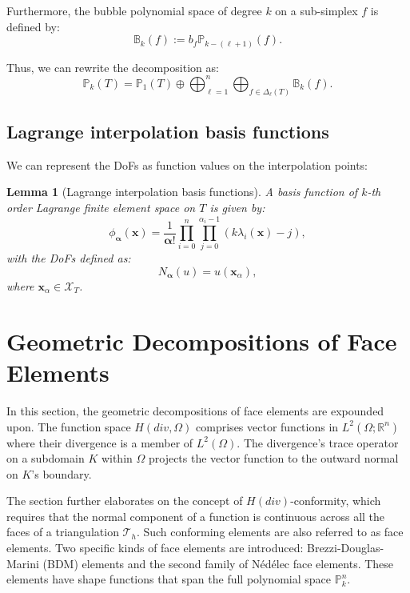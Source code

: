\documentclass[12pt, a4paper]{article}
\newcommand{\bs}{\boldsymbol}
\newtheorem{lemma}{Lemma}
\begin{document}
Furthermore, the bubble polynomial space of degree $k$ on a sub-simplex $f$ is defined by:
$$
\mathbb B_{k}( f) := b_f\mathbb P_{k - (\ell +1)} (f).
$$

Thus, we can rewrite the decomposition as:
\begin{equation}
\mathbb P_k(T) = \mathbb P_1(T) \oplus \bigoplus_{\ell = 1}^n \bigoplus_{f\in \Delta_{\ell}(T)} \mathbb B_{k}( f).
\end{equation}

\subsection{Lagrange interpolation basis functions}

We can represent the DoFs as function values on the interpolation points:

\begin{lemma}[Lagrange interpolation basis functions]
\label{le:li}
A basis function of $k$-th order Lagrange finite element space on $T$ is given by:
\[
\phi_{\boldsymbol \alpha}(\boldsymbol x) = \frac{1}{\boldsymbol \alpha!} \prod_{i=0}^{n}\prod_{j =0}^{\alpha_i - 1} (k\lambda_i(\boldsymbol x) - j),
\]
with the DoFs defined as:
\[
N_{\bs \alpha} (u) = u(\boldsymbol x_{\alpha}),
\]
where $\boldsymbol x_{\alpha} \in \mathcal X_{T}$.
\end{lemma}



\section{Geometric Decompositions of Face Elements}


In this section, the geometric decompositions of face elements are expounded upon.
The function space \(H(div, \Omega)\) comprises vector functions in \(L^2(\Omega; \mathbb{R}^n)\)
where their divergence is a member of \(L^2(\Omega)\). The divergence's trace operator on
a subdomain \(K\) within \(\Omega\) projects the vector function to the outward normal on \(K\)'s boundary.

The section further elaborates on the concept of \(H(div)\)-conformity, which
requires that the normal component of a function is continuous across all the
faces of a triangulation \(\mathcal{T}_h\). Such conforming elements are also
referred to as face elements. Two specific kinds of face elements are
introduced: Brezzi-Douglas-Marini (BDM) elements and the second family of
N\'ed\'elec face elements. These elements have shape functions that span the
full polynomial space \(\mathbb{P}_k^n\).
\end{document}
